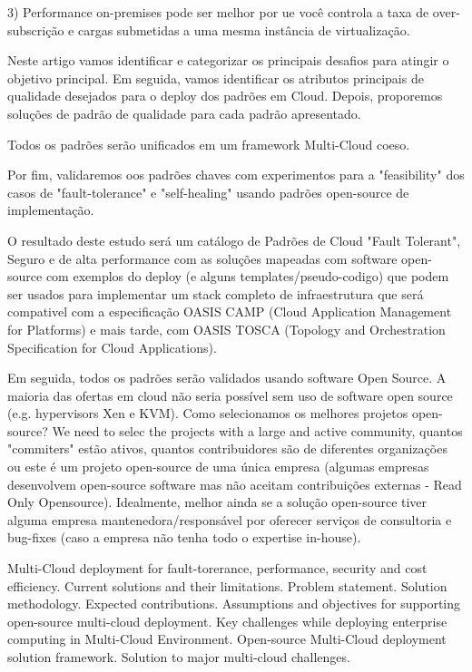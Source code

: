 \documentclass[12pt]{article}
\begin{document}
		3) Performance on-premises pode ser melhor por ue você controla a taxa de over-subscrição e cargas submetidas a uma mesma instância de virtualização.
		
		Neste artigo vamos identificar e categorizar os principais desafios para atingir o objetivo principal. Em seguida, vamos identificar os atributos principais de qualidade desejados para o deploy dos padrões em Cloud. Depois, proporemos soluções de padrão de qualidade para cada padrão apresentado. 
		
		Todos os padrões serão unificados em um framework Multi-Cloud coeso.
		
		Por fim, validaremos oos padrões chaves com experimentos para a "feasibility" dos casos de "fault-tolerance" e "self-healing" usando padrões open-source de implementação.
		
		O resultado deste estudo será um catálogo de Padrões de Cloud "Fault Tolerant", Seguro e de alta performance com as soluções mapeadas com software open-source com exemplos do deploy (e alguns templates/pseudo-codigo) que podem ser usados para implementar um stack completo de infraestrutura que será compativel com a especificação OASIS CAMP (Cloud Application Management for Platforms) e mais tarde, com OASIS TOSCA (Topology and Orchestration Specification for Cloud Applications).
		
		Em seguida, todos os padrões serão validados usando software Open Source. A maioria das ofertas em cloud não seria possível sem uso de software open source (e.g. hypervisors Xen e KVM). Como selecionamos os melhores projetos open-source? We need to selec the projects with a large and active community, quantos "commiters" estão ativos, quantos contribuidores são de diferentes organizações ou este é um projeto open-source de uma única empresa (algumas empresas desenvolvem open-source software mas não aceitam contribuições externas - Read Only Opensource). Idealmente, melhor ainda se a solução open-source tiver alguma empresa mantenedora/responsável por oferecer serviços de consultoria e bug-fixes (caso a empresa não tenha todo o expertise in-house). 
		
		\hspace{3cm}Multi-Cloud deployment for fault-torerance, performance, security and cost efficiency.
		Current solutions and their limitations.
		Problem statement.
		Solution methodology.
		Expected contributions.
		Assumptions and objectives for supporting open-source multi-cloud deployment.
		Key challenges while deploying enterprise computing in Multi-Cloud Environment.
		Open-source Multi-Cloud deployment solution framework.
		Solution to major multi-cloud challenges.
		
\end{document}
